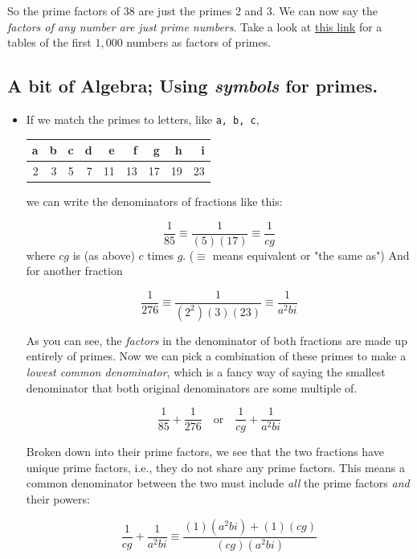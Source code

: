 \documentclass[koma]{article}
\begin{document}
So the prime factors of \(38\) are just the primes \(2\) and \(3\). We can now say the \emph{factors of any number are just prime numbers}. Take a look at \href{https://en.wikipedia.org/wiki/Table_of_prime_factors}{this link} for a tables of the first \(1,000\) numbers as factors of primes.

\subsection{A bit of Algebra; Using \emph{symbols} for primes.}
\label{sec:orgheadline7}

\begin{itemize}
\item If we match the primes to letters, like \texttt{a, b, c},

\begin{center}
\label{tab:orgtable2}

\begin{tabular}{rrrrrrrrr}
a & b & c & d & e & f & g & h & i\\
\hline
2 & 3 & 5 & 7 & 11 & 13 & 17 & 19 & 23\\
\end{tabular}
\end{center}

we can write the denominators of fractions like this:

\[
  \frac{1}{85} \equiv \frac{1}{(5)(17)} \equiv \frac{1}{cg}
  \]
where \(cg\) is (as above) \(c\) times \(g\). (\(\equiv\) means equivalent or "the same as") And for another fraction

\[
  \frac{1}{276} \equiv \frac{1}{(2^2)(3)(23)} \equiv \frac{1}{a^2bi}
  \]

As you can see, the \emph{factors} in the denominator of both fractions are made up entirely of primes. Now we can pick a combination of these primes to make a \emph{lowest common denominator}, which is a fancy way of saying the smallest denominator that both original denominators are some multiple of.

\[
  \frac{1}{85} + \frac{1}{276} \quad \textrm{or} \quad \frac{1}{cg} + \frac{1}{a^2bi}
  \]

Broken down into their prime factors, we see that the two fractions have unique prime factors, i.e., they do not share any prime factors. This means a common denominator between the two must include \emph{all} the prime factors \emph{and} their powers:

\[
  \frac{1}{cg} + \frac{1}{a^2bi} \equiv \frac{(1)(a^2bi) + (1)(cg)}{(cg)(a^2bi)}
  \]


\end{itemize}
\end{document}
